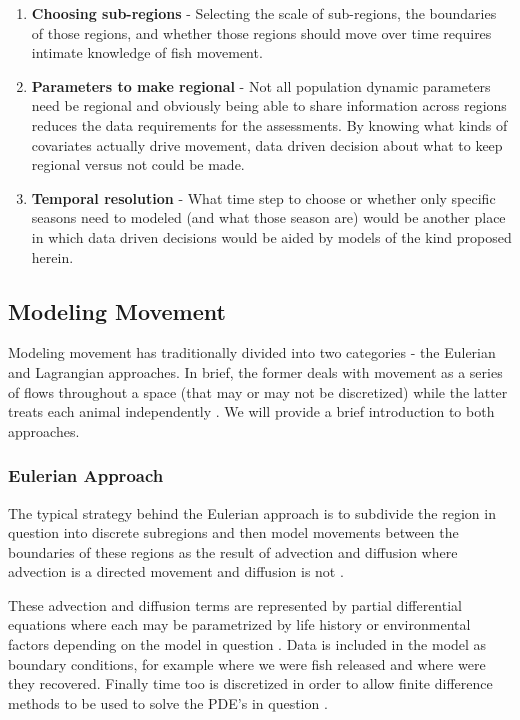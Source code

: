 \documentclass[11pt]{article}
\begin{document}
\begin{enumerate}
\item \textbf{Choosing sub-regions} - Selecting the scale of sub-regions, the boundaries of those regions, and whether those regions should move over time requires intimate knowledge of fish movement.
\item \textbf{Parameters to make regional} - Not all population dynamic parameters need be regional and obviously being able to share information across regions reduces the data requirements for the assessments. By knowing what kinds of covariates actually drive movement, data driven decision about what to keep regional versus not could be made.
\item \textbf{Temporal resolution} - What time step to choose or whether only specific seasons need to modeled (and what those season are) would be another place in which data driven decisions would be aided by models of the kind proposed herein. 
\end{enumerate}

\newpage


\subsection{Modeling Movement}

Modeling movement has traditionally divided into two categories - the Eulerian and Lagrangian approaches. In brief, the former deals with movement as a series of flows throughout a space (that may or may not be discretized) while the latter treats each animal independently \cite{waltersmartell}. We will provide a brief introduction to both approaches.

\subsubsection{Eulerian Approach}

The typical strategy behind the Eulerian approach is to subdivide the region in question into discrete subregions and then model movements between the boundaries of these regions as the result of advection and diffusion where advection is a directed movement and diffusion is not \cite{sibert1999} \cite{lehodey2008}. 

These advection and diffusion terms are represented by partial differential equations where each may be parametrized by life history or environmental factors depending on the model in question \cite{lehodey2008}. Data is included in the model as boundary conditions, for example where we were fish released and where were they recovered. Finally time too is discretized in order to allow finite difference methods to be used to solve the PDE's in question \cite{sibert1999}. 
\end{document}
